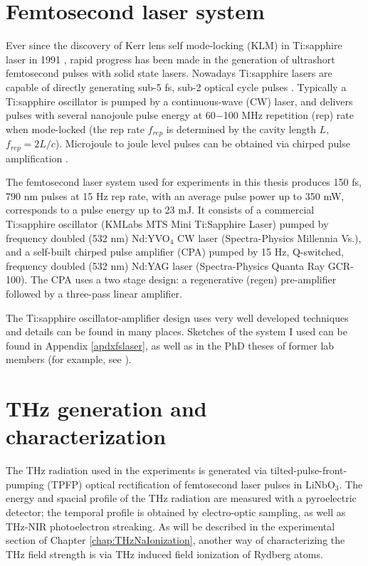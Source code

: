 \section{Femtosecond laser system}

Ever since the discovery of Kerr lens self mode-locking (KLM) in Ti:sapphire laser in 1991 \cite{KLMfsLaser1991}, rapid progress has been made in the generation of ultrashort femtosecond pulses with solid state lasers. Nowadays Ti:sapphire lasers are capable of
directly generating sub-5 fs, sub-2 optical cycle pulses \cite{5fsLaser1999,5fsLaser2001}. Typically a Ti:sapphire oscillator is pumped by a continuous-wave (CW) laser, and delivers pulses with several nanojoule pulse energy at 60$-$100 MHz repetition (rep) rate when mode-locked (the rep rate $f_{rep}$ is determined by the cavity length $L$, $f_{rep}=2L/c$). Microjoule to joule level pulses can be obtained via chirped pulse amplification \cite{CPA1985}.

The femtosecond laser system used for experiments in this thesis produces 150 fs, 790 nm pulses at 15 Hz rep rate, with an average pulse power up to 350 mW, corresponds to a pulse energy up to 23 mJ. It consists of a commercial Ti:sapphire oscillator (KMLabs MTS Mini Ti:Sapphire Laser) pumped by frequency doubled (532 nm) Nd:YVO$_{4}$ CW laser (Spectra-Physics Millennia Vs.), and a self-built chirped pulse amplifier (CPA) pumped by 15 Hz, Q-switched, frequency doubled (532 nm) Nd:YAG laser (Spectra-Physics Quanta Ray GCR-100). The CPA uses a two stage design: a regenerative (regen) pre-amplifier followed by a three-pass linear amplifier.

The Ti:sapphire oscillator-amplifier design uses very well developed techniques and details can be found in many places. Sketches of the system I used can be found in Appendix \ref{apdxfslaser}, as well as in the PhD theses of former lab members (for example, see \cite{Murray-KrezanThesis2007,ZhangThesis2008}).

\section{THz generation and characterization}

The THz radiation used in the experiments is generated via tilted-pulse-front-pumping (TPFP) optical rectification of femtosecond laser pulses in LiNbO$_{3}$. The energy and spacial profile of the THz radiation are measured with a pyroelectric detector; the temporal profile is obtained by electro-optic sampling, as well as THz-NIR photoelectron streaking. As will be described in the experimental section of Chapter \ref{chap:THzNaIonization}, another way of characterizing the THz field strength is via THz induced field ionization of Rydberg atoms.

